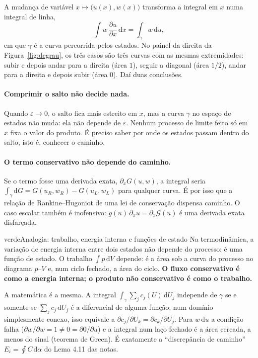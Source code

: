 \documentclass[11pt,a4paper]{article}
\theoremstyle{definition}
\theoremstyle{remark}
\newcommand{\pd}[2]{\frac{\partial #1}{\partial #2}}
\newcommand{\dd}{\mathrm{d}}
\begin{document}
A mudança de variável $x\mapsto\big(u(x),w(x)\big)$ transforma a integral em $x$ numa integral de linha,
\[
\int w\,\pd{u}{x}\,\dd x=\int_\gamma w\,\dd u ,
\]
em que $\gamma$ é a curva percorrida pelos estados. No painel da direita da Figura~\ref{fig:degrau}, os três casos são três curvas com as mesmas extremidades: subir e depois andar para a direita (área $1$), seguir a diagonal (área $1/2$), andar para a direita e depois subir (área $0$). Daí duas conclusões.

\paragraph{Comprimir o salto não decide nada.} Quando $\varepsilon\to0$, o salto fica mais estreito em $x$, mas a curva $\gamma$ no espaço de estados não muda: ela não depende de $\varepsilon$. Nenhum processo de limite feito só em $x$ fixa o valor do produto. É preciso saber por onde os estados passam dentro do salto, isto é, conhecer o caminho.

\paragraph{O termo conservativo não depende do caminho.} Se o termo fosse uma derivada exata, $\partial_xG(u,w)$, a integral seria $\int_\gamma\dd G=G(u_R,w_R)-G(u_L,w_L)$ para qualquer curva. É por isso que a relação de Rankine--Hugoniot de uma lei de conservação dispensa caminho. O caso escalar também é inofensivo: $g(u)\,\partial_xu=\partial_x\mathcal G(u)$ é uma derivada exata disfarçada.

\begin{quadro}{verde}{Analogia: trabalho, energia interna e funções de estado}
Na termodinâmica, a variação de energia interna entre dois estados não depende do processo: é uma função de estado. O trabalho $\int p\,\dd V$ depende: é a área sob a curva do processo no diagrama $p$--$V$ e, num ciclo fechado, a área do ciclo. \textbf{O fluxo conservativo é como a energia interna; o produto não conservativo é como o trabalho.}

A matemática é a mesma. A integral $\int_\gamma\sum_jc_j(U)\,\dd U_j$ independe de $\gamma$ se e somente se $\sum_j c_j\,\dd U_j$ é a diferencial de alguma função; num domínio simplesmente conexo, isso equivale a $\partial c_j/\partial U_k=\partial c_k/\partial U_j$. Para $w\,\dd u$ a condição falha ($\partial w/\partial w=1\neq0=\partial 0/\partial u$) e a integral num laço fechado é a área cercada, a menos do sinal (teorema de Green). É exatamente a ``discrepância de caminho'' $E_i=\oint C\,\dd\alpha$ do Lema 4.11 das notas.
\end{quadro}
\end{document}
